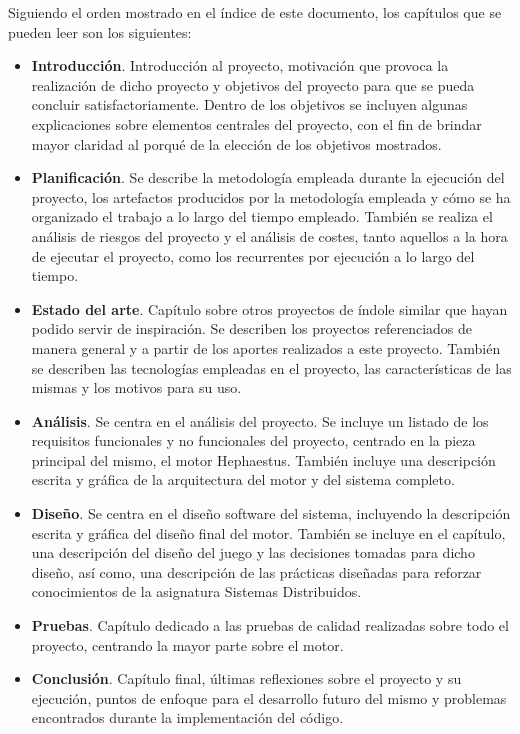 Siguiendo el orden mostrado en el índice de este documento, los capítulos que se pueden leer son los siguientes:

\begin{itemize}
	\item \textbf{Introducción}. Introducción al proyecto, motivación que provoca la realización de dicho proyecto y objetivos del proyecto para que se pueda concluir satisfactoriamente. Dentro de los objetivos se incluyen algunas explicaciones sobre elementos centrales del proyecto, con el fin de brindar mayor claridad al porqué de la elección de los objetivos mostrados.
	\item \textbf{Planificación}. Se describe la metodología empleada durante la ejecución del proyecto, los artefactos producidos por la metodología empleada y cómo se ha organizado el trabajo a lo largo del tiempo empleado. También se realiza el análisis de riesgos del proyecto y el análisis de costes, tanto aquellos a la hora de ejecutar el proyecto, como los recurrentes por ejecución a lo largo del tiempo.
	\item \textbf{Estado del arte}. Capítulo sobre otros proyectos de índole similar que hayan podido servir de inspiración. Se describen los proyectos referenciados de manera general y a partir de los aportes realizados a este proyecto. También se describen las tecnologías empleadas en el proyecto, las características de las mismas y los motivos para su uso.
	\item \textbf{Análisis}. Se centra en el análisis del proyecto. Se incluye un listado de los requisitos funcionales y no funcionales del proyecto, centrado en la pieza principal del mismo, el motor Hephaestus. También incluye una descripción escrita y gráfica de la arquitectura del motor y del sistema completo.
	\item \textbf{Diseño}. Se centra en el diseño software del sistema, incluyendo la descripción escrita y gráfica del diseño final del motor. También se incluye en el capítulo, una descripción del diseño del juego y las decisiones tomadas para dicho diseño, así como, una descripción de las prácticas diseñadas para reforzar conocimientos de la asignatura Sistemas Distribuidos.
	\item \textbf{Pruebas}. Capítulo dedicado a las pruebas de calidad realizadas sobre todo el proyecto, centrando la mayor parte sobre el motor.
	\item \textbf{Conclusión}. Capítulo final, últimas reflexiones sobre el proyecto y su ejecución, puntos de enfoque para el desarrollo futuro del mismo y problemas encontrados durante la implementación del código.
\end{itemize}

